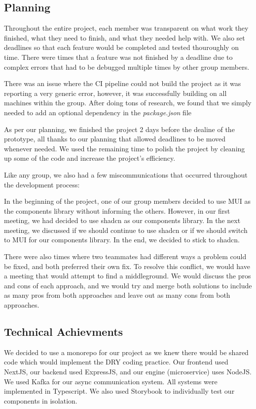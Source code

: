 \documentclass[a4paper, 12pt]{article}
\newcommand{\Example}[1]{\begin{example}#1\end{example}}
\begin{document}
\subsection*{Planning}
Throughout the entire project, each member was transparent on what work they finished, what they need to finish, and what they needed help with. We also set deadlines so that each feature would be completed and tested thouroughly on time. There were times that a feature was not finished by a deadline due to complex errors that had to be debugged multiple times by other group members.

\Example {There was an issue where the CI pipeline could not build the project as it was reporting a very generic error, however, it was successfully building on all machines within the group. After doing tons of research, we found that we simply needed to add an optional dependency in the \emph{package.json} file}

As per our planning, we finished the project 2 days before the dealine of the prototype, all thanks to our planning that allowed deadlines to be moved whenever needed. We used the remaining time to polish the project by cleaning up some of the code and increase the project's efficiency.

Like any group, we also had a few miscommunications that occurred throughout the development process:

\Example {In the beginning of the project, one of our group members decided to use MUI as the components library without informing the others. However, in our first meeting, we had decided to use shadcn as our components library. In the next meeting, we discussed if we should continue to use shadcn or if we should switch to MUI for our components library. In the end, we decided to stick to shadcn.}
         
There were also times where two teammates had different ways a problem could be fixed, and both preferred their own fix. To resolve this conflict, we would have a meeting that would attempt to find a middleground. We would discuss the pros and cons of each approach, and we would try and merge both solutions to include as many pros from both approaches and leave out as many cons from both approaches.

\subsection*{Technical Achievments}
We decided to use a monorepo for our project as we knew there would be shared code which would implement the DRY coding practice. Our frontend used NextJS, our backend used ExpressJS, and our engine (microservice) uses NodeJS. We used Kafka for our async communication system. All systems were implemented in Typescript. We also used Storybook to individually test our components in isolation.
\end{document}
